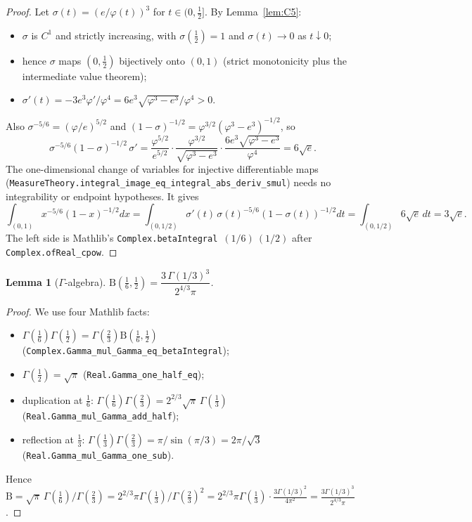 \documentclass[11pt]{article}
\newtheorem{lemma}[theorem]{Lemma}
\theoremstyle{definition}
\theoremstyle{remark}
\newcommand{\lean}[1]{\texttt{#1}}
\begin{document}
\begin{proof}
Let $\sigma(t)=(e/\varphi(t))^3$ for $t\in(0,\tfrac12]$. By Lemma~\ref{lem:C5}:
\begin{itemize}
\item $\sigma$ is $C^1$ and strictly increasing, with $\sigma(\tfrac12)=1$ and $\sigma(t)\to0$ as $t\downarrow0$;
\item hence $\sigma$ maps $(0,\tfrac12)$ bijectively onto $(0,1)$ (strict monotonicity plus the intermediate value
theorem);
\item $\sigma'(t)=-3e^3\varphi'/\varphi^4=6e^3\sqrt{\varphi^3-e^3}/\varphi^4>0$.
\end{itemize}
Also $\sigma^{-5/6}=(\varphi/e)^{5/2}$ and $(1-\sigma)^{-1/2}=\varphi^{3/2}(\varphi^3-e^3)^{-1/2}$, so
\[
 \sigma^{-5/6}(1-\sigma)^{-1/2}\,\sigma'
 =\frac{\varphi^{5/2}}{e^{5/2}}\cdot\frac{\varphi^{3/2}}{\sqrt{\varphi^3-e^3}}\cdot
  \frac{6e^3\sqrt{\varphi^3-e^3}}{\varphi^4}=6\sqrt e .
\]
The one-dimensional change of variables for injective differentiable maps
(\lean{MeasureTheory.integral\_image\_eq\_integral\_abs\_deriv\_smul}) needs no integrability or endpoint hypotheses. It gives
\[
 \int_{(0,1)}x^{-5/6}(1-x)^{-1/2}dx=\int_{(0,1/2)}\sigma'(t)\,\sigma(t)^{-5/6}(1-\sigma(t))^{-1/2}dt
 =\int_{(0,1/2)}6\sqrt e\,dt=3\sqrt e .
\]
The left side is Mathlib's \lean{Complex.betaIntegral}\ $(1/6)\ (1/2)$ after \lean{Complex.ofReal\_cpow}.
\end{proof}

\begin{lemma}[$\Gamma$-algebra]\label{lem:C7}
$\mathrm B(\tfrac16,\tfrac12)=\dfrac{3\,\Gamma(1/3)^3}{2^{4/3}\pi}$.
\end{lemma}

\begin{proof}
We use four Mathlib facts:
\begin{itemize}
\item $\Gamma(\tfrac16)\Gamma(\tfrac12)=\Gamma(\tfrac23)\mathrm B(\tfrac16,\tfrac12)$
(\lean{Complex.Gamma\_mul\_Gamma\_eq\_betaIntegral});
\item $\Gamma(\tfrac12)=\sqrt\pi$ (\lean{Real.Gamma\_one\_half\_eq});
\item duplication at $\tfrac16$: $\Gamma(\tfrac16)\Gamma(\tfrac23)=2^{2/3}\sqrt\pi\,\Gamma(\tfrac13)$
(\lean{Real.Gamma\_mul\_Gamma\_add\_half});
\item reflection at $\tfrac13$: $\Gamma(\tfrac13)\Gamma(\tfrac23)=\pi/\sin(\pi/3)=2\pi/\sqrt3$
(\lean{Real.Gamma\_mul\_Gamma\_one\_sub}).
\end{itemize}
Hence
$\mathrm B=\sqrt\pi\,\Gamma(\tfrac16)/\Gamma(\tfrac23)=2^{2/3}\pi\Gamma(\tfrac13)/\Gamma(\tfrac23)^2
=2^{2/3}\pi\Gamma(\tfrac13)\cdot\frac{3\Gamma(1/3)^2}{4\pi^2}=\frac{3\Gamma(1/3)^3}{2^{4/3}\pi}$.
\end{proof}
\end{document}
